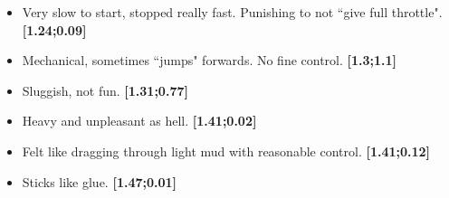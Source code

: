 \begin{itemize}[noitemsep,nolistsep]
\item Very slow to start, stopped really fast. Punishing to not ``give full throttle". \textbf{[1.24;0.09]}
\item Mechanical, sometimes ``jumps" forwards. No fine control. \textbf{[1.3;1.1]}
\item Sluggish, not fun. \textbf{[1.31;0.77]}
\item Heavy and unpleasant as hell. \textbf{[1.41;0.02]}
\item Felt like dragging through light mud with reasonable control. \textbf{[1.41;0.12]}
\item Sticks like glue. \textbf{[1.47;0.01]}
\end{itemize}



